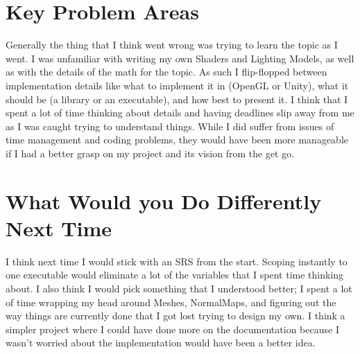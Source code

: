 \documentclass{article}
\begin{document}
\section{Key Problem Areas}

Generally the thing that I think went wrong was trying to learn the topic as I 
went. I was unfamiliar with writing my own Shaders and Lighting Models, as well 
as with the details of the math for the topic. As such I flip-flopped between 
implementation details like what to implement it in (OpenGL or Unity), what it 
should be (a library or an executable), and how best to present it. I think 
that I spent a lot of time thinking about details and having deadlines slip 
away from me as I was caught trying to understand things. While I did suffer 
from issues of time management and coding problems, they would have been more 
manageable if I had a better grasp on my project and its vision from the get go.


\section{What Would you Do Differently Next Time}
I think next time I would stick with an SRS from the start. Scoping instantly 
to one executable would eliminate a lot of the variables that I spent time 
thinking about. I also think I would pick something that I understood better; I 
spent a lot of time wrapping my head around Meshes, NormalMaps, and figuring 
out the way things are currently done that I got lost trying to design my own. 
I think a simpler project where I could have done more on the documentation 
because I wasn't worried about the implementation would have been a better idea.
\end{document}
